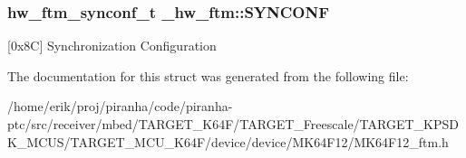 \subsubsection[{\texorpdfstring{S\+Y\+N\+C\+O\+NF}{SYNCONF}}]{ {\bf hw\+\_\+ftm\+\_\+synconf\+\_\+t} \+\_\+hw\+\_\+ftm\+::\+S\+Y\+N\+C\+O\+NF}\hypertarget{struct__hw__ftm_a9d4cf38596c900b6d18b5bada5dd713e}{}\label{struct__hw__ftm_a9d4cf38596c900b6d18b5bada5dd713e}
\mbox{[}0x8C\mbox{]} Synchronization Configuration 

The documentation for this struct was generated from the following file\+:\begin{DoxyCompactItemize}
\item 
/home/erik/proj/piranha/code/piranha-\/ptc/src/receiver/mbed/\+T\+A\+R\+G\+E\+T\+\_\+\+K64\+F/\+T\+A\+R\+G\+E\+T\+\_\+\+Freescale/\+T\+A\+R\+G\+E\+T\+\_\+\+K\+P\+S\+D\+K\+\_\+\+M\+C\+U\+S/\+T\+A\+R\+G\+E\+T\+\_\+\+M\+C\+U\+\_\+\+K64\+F/device/device/\+M\+K64\+F12/M\+K64\+F12\+\_\+ftm.\+h\end{DoxyCompactItemize}
